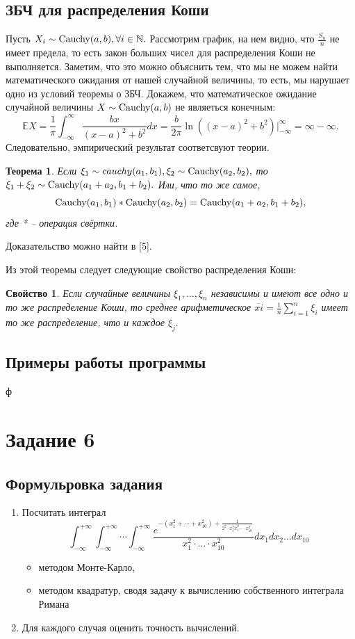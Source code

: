 \documentclass[11pt]{article}
\newtheorem{theorem}{Теорема}
\newtheorem{properties}{Свойство}
\newcommand{\cauchy}{\normalfont{\text{Cauchy}}}
\numberwithin{equation}{section}
\begin{document}
\subsection{ЗБЧ для распределения Коши}
Пусть $X_i \sim \cauchy(a,b), \forall i \in \mathbb{N}.$ Рассмотрим график, на нем видно, что $ \frac{S_n}{n}$ не имеет
предела, то есть закон больших чисел для распределения Коши не выполняется.
Заметим, что это можно объяснить тем, что мы не можем найти математического ожидания от нашей случайной величины, то есть, мы нарушает одно из условий теоремы о ЗБЧ. 
Докажем, что математическое ожидание случайной величины $X \sim \cauchy(a,b)$ не являеться конечным:
$$ \mathbb{E}X = \frac{1}{\pi} \int_{-\infty}^{\infty} \frac{bx}{(x-a)^2+b^2}dx = \frac{b}{2\pi} \ln((x-a)^2+b^2) \bigg|_{-\infty}^{\infty} = \infty - \infty.$$
Следовательно, эмпирический результат соответсвуют теории.
\begin{theorem}
  Если $\xi_1 \sim \\cauchy(a_1,b_1), \xi_2 \sim \cauchy(a_2,b_2),$ то $\xi_1+\xi_2 \sim \cauchy(a_1+a_2, b_1+b_2).$ Или, что то же самое,
  $$ \cauchy(a_1,b_1)* \cauchy(a_2,b_2) = \cauchy(a_1+a_2, b_1+b_2),$$
  где * -- операция свёртки.
\end{theorem}
Доказательство можно найти в [5].

Из этой теоремы следует следующие свойство распределения Коши:
\begin{properties}
  Если случайные величины $\xi_1, \dots, \xi_n$ независимы и имеют все одно и то же распределение Коши, то среднее арифметическое 
  $\overline{xi} = \frac{1}{n} \sum_{i=1}^{n}\xi_i$ имеет то же распределение, что и каждое $\xi_j.$
\end{properties}
\subsection{Примеры работы программы}
ф
\section{Задание 6}
\subsection{Формульровка задания}
\begin{enumerate}
   \item Посчитать интеграл 
  $$ \int_{-\infty}^{+\infty} \int_{-\infty}^{+\infty} \cdots \int_{-\infty}^{+\infty} \frac{e^{-(x_1^2+\cdots+x_{10}^2)+\frac{1}{2^7 \cdot x_1^2 \dot x_1^2 \cdots \cdot x_{10}^2}   }}{x_1^2 \cdot \dots \cdot x_{10}^2} dx_1 dx_2 \dots dx_{10}$$
  \begin{itemize}
    \item методом Монте-Карло,
    \item  методом квадратур, сводя задачу к вычислению собственного интеграла Римана
  \end{itemize}
  \item Для каждого случая оценить точность вычислений.
\end{enumerate}
\end{document}
